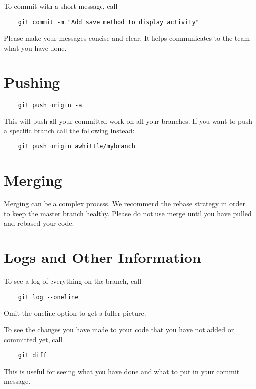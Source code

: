 \documentclass[14pt]{report}
\begin{document}
	To commit with a short message, call 
	\begin{verbatim}
	git commit -m "Add save method to display activity"
	\end{verbatim}
	
	Please make your messages concise and clear.
	It helps communicates to the team what you have done.
		
	\section{Pushing}
	
	\begin{verbatim}
	git push origin -a
	\end{verbatim}
	
	This will push all your committed work on all your branches.  If you want to push a specific branch call the following instead:
	
	\begin{verbatim}
	git push origin awhittle/mybranch
	\end{verbatim}
	
	\section{Merging}
	
	Merging can be a complex process.
	We recommend the rebase strategy in order to keep the master branch healthy.
	Please do not use merge until you have pulled and rebased your code.
	
	\section{Logs and Other Information}
	
	To see a log of everything on the branch, call
	
	\begin{verbatim}
	git log --oneline
	\end{verbatim}
	
	Omit the oneline option to get a fuller picture.
	
	To see the changes you have made to your code that you have not added or committed yet, call
	
	\begin{verbatim}
	git diff
	\end{verbatim}
	
	This is useful for seeing what you have done and what to put in your commit message.
	
	
\end{document}
